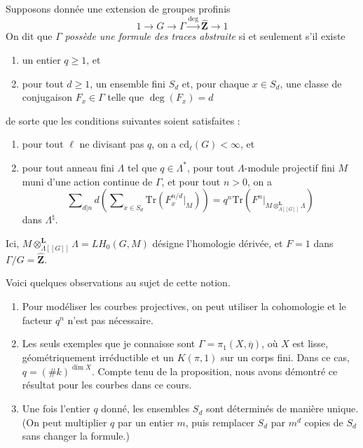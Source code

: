 \noindent
Supposons donnée une extension de groupes profinis
$$
1 \to G \to \Gamma \xrightarrow{\deg} \widehat{\mathbf{Z}} \to 1
$$
On dit que $\Gamma$ {\it possède une formule des traces abstraite} si et seulement s'il
existe
\begin{enumerate}
\item un entier $q\geq 1$, et
\item pour tout $d\geq 1$, un ensemble fini $S_d$ et, pour chaque $x\in S_d$, une
classe de conjugaison $F_x \in \Gamma$ telle que $\deg(F_x) = d$
\end{enumerate}
de sorte que les conditions suivantes soient satisfaites :
\begin{enumerate}
\item pour tout $\ell$ ne divisant pas $q$, on a $\text{cd}_\ell(G)<\infty$, et
\item pour tout anneau fini $\Lambda$ tel que $q\in \Lambda^*$,
pour tout $\Lambda$-module projectif fini $M$ muni d'une action continue de
$\Gamma$, et pour tout $n > 0$, on a
$$
\sum\nolimits_{d|n}d \left(
\sum\nolimits_{x \in S_d}
\text{Tr}( F_x^{n/d} |_M)
\right)
=
q^n \text{Tr}(F^n|_{M \otimes_{\Lambda[[G]]}^{\mathbf{L}}\Lambda})
$$
dans $\Lambda^\natural$.
\end{enumerate}
Ici, $M \otimes_{\Lambda[[G]]}^{\mathbf{L}}\Lambda = LH_0(G, M)$ désigne
l'homologie dérivée, et $F=1$ dans $\Gamma/G = \widehat{\mathbf{Z}}$.

\begin{remark}
\label{remark-abstract-trace-formula}
Voici quelques observations au sujet de cette notion.
\begin{enumerate}
\item Pour modéliser les courbes projectives, on peut utiliser la cohomologie et
le facteur $q^n$ n'est pas nécessaire.
\item Les seuls exemples que je connaisse sont $\Gamma = \pi_1(X, \overline \eta)$,
où $X$ est lisse, géométriquement irréductible et un $K(\pi, 1)$ sur un corps
fini. Dans ce cas, $q = (\# k)^{\dim X}$. Compte tenu de la proposition, nous avons démontré
ce résultat pour les courbes dans ce cours.
\item Une fois l'entier $q$ donné, les ensembles $S_d$ sont déterminés de manière
unique. (On peut multiplier $q$ par un entier $m$, puis remplacer $S_d$ par
$m^d$ copies de $S_d$ sans changer la formule.)
\end{enumerate}
\end{remark}

